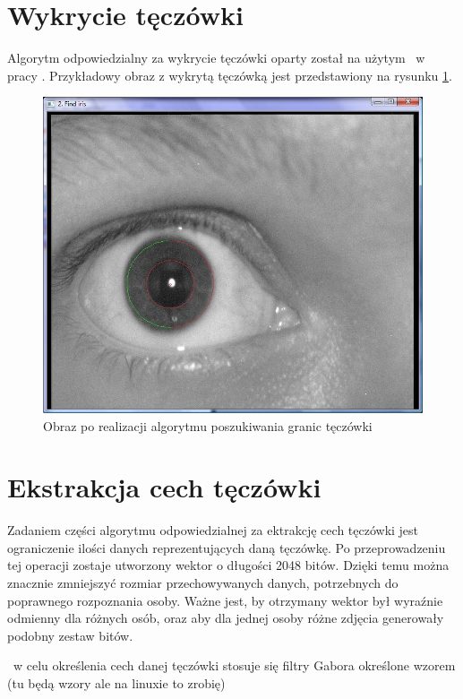 \section{Wykrycie tęczówki}
\label{sec:wykrycieTeczowki}
Algorytm odpowiedzialny za wykrycie tęczówki oparty został na użytym ~w pracy \cite{Gl11}. Przykładowy obraz z wykrytą tęczówką jest przedstawiony na rysunku \ref{fig:teczowkaNasza}.

\begin{figure}
\label{fig:teczowkaNasza}
\begin{center}
\includegraphics[scale=0.5]{teczowka.jpg}
\caption{Obraz po realizacji algorytmu poszukiwania granic tęczówki}
\end{center}
\end{figure}

\section{Ekstrakcja cech tęczówki}
\label{sec:ekstrakcja}
Zadaniem części algorytmu odpowiedzialnej za ektrakcję cech tęczówki jest ograniczenie ilości danych reprezentujących daną tęczówkę. Po przeprowadzeniu tej operacji zostaje utworzony wektor o długości 2048 bitów. Dzięki temu można znacznie zmniejszyć rozmiar przechowywanych danych, potrzebnych do poprawnego rozpoznania osoby. Ważne jest, by otrzymany wektor był wyraźnie odmienny dla różnych osób, oraz aby dla jednej osoby różne zdjęcia generowały podobny zestaw bitów. 

~w celu określenia cech danej tęczówki stosuje się filtry Gabora określone wzorem (tu będą wzory ale na linuxie to zrobię)

